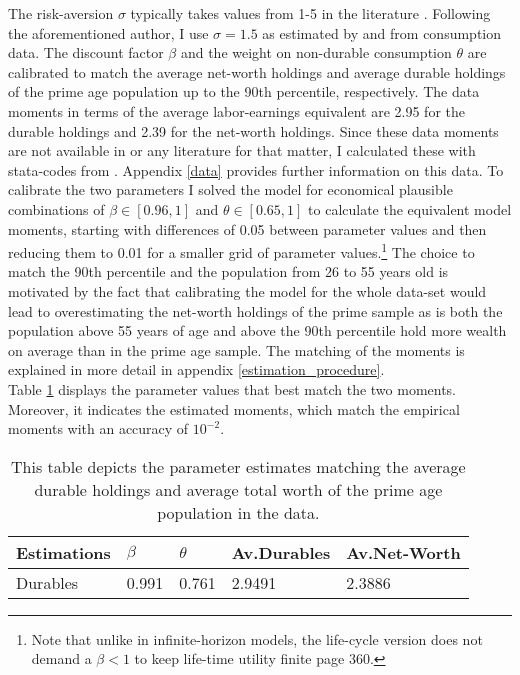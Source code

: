 \documentclass[a4paper,12pt,legno]{article}
\begin{document}
The risk-aversion $\sigma$ typically takes values from 1-5 in the literature \citep{yang2009}. Following the aforementioned author, I use $\sigma = 1.5$ as estimated by \cite{attanasio1999} and \cite{Gourinchas&Parker2002} from consumption data. The discount factor $\beta$ and the weight on non-durable consumption $\theta$ are calibrated to match the average net-worth holdings and average durable holdings of the prime age population up to the 90th percentile, respectively. The data moments in terms of the average labor-earnings equivalent are 2.95 for the durable holdings and 2.39 for the net-worth  holdings. Since these data moments are not available in \citep{hintermaier2011} or any literature for that matter, I calculated these with stata-codes from \cite{hintermaier2016}. Appendix \ref{data} provides further information on this data. To calibrate the two parameters I solved the model for economical plausible combinations of $\beta \in [0.96,1]$ and $\theta \in [0.65,1]$ to calculate the equivalent model moments, starting with differences of 0.05 between parameter values and then reducing them to 0.01 for a smaller grid of parameter values.\footnote{Note that unlike in infinite-horizon models, the life-cycle version does not demand a $\beta < 1$ to keep life-time utility finite \cite{heer2004dge} page 360.} The choice to match the 90th percentile and the population from 26 to 55 years old is motivated by the fact that calibrating the model for the whole data-set would lead to overestimating the net-worth holdings of the prime sample \textendash as is both the population above 55 years of age and above the 90th percentile hold more wealth on average than in the prime age sample. The matching of the moments is explained in more detail in appendix \ref{estimation_procedure}. \\
Table \ref{estimates} displays the parameter values that best match the two moments. Moreover, it indicates the estimated moments, which match the empirical moments with an accuracy of $10^{-2}$.

\begin{table}[!htbp]
\centering
\caption{This table depicts the parameter estimates matching the average durable holdings and average total worth of the prime age population in the data.}
\label{estimates}
\begin{tabular}{llllll}
\hline
\multicolumn{2}{l}{Estimations} & $\beta$ & $\theta$ & Av.Durables & Av.Net-Worth\\ \hline
\multicolumn{2}{l}{Durables}             & 0.991    & 0.761  & 2.9491 & 2.3886      \\
  
\end{tabular}
\end{table}
\end{document}
